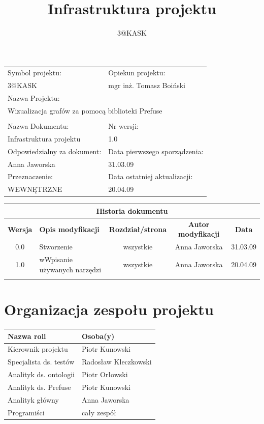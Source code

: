 \documentclass[a4paper,10pt,twoside]{article}
\title{Infrastruktura projektu}
\author{3@KASK}
\begin{document}



\maketitle


\begin{center}
\begin{tabular}{|p{7cm}|p{7cm}|}
\hline
Symbol projektu: & Opiekun projektu:   \tabularnewline 
3@KASK & mgr inż. Tomasz Boiński    \tabularnewline \hline
\multicolumn{2}{|l|}{Nazwa Projektu: } \tabularnewline
\multicolumn{2}{|l|}{Wizualizacja grafów za pomocą biblioteki Prefuse } \tabularnewline 
\hline
\multicolumn{2}{l}{ } \tabularnewline %
\hline 
Nazwa Dokumentu: & Nr wersji:   \tabularnewline 
Infrastruktura projektu & 1.0 \tabularnewline \hline
Odpowiedzialny za dokument: & Data pierwszego sporządzenia:   \tabularnewline 
Anna Jaworska  & 31.03.09 \tabularnewline \hline
Przeznaczenie: & Data ostatniej aktualizacji:   \tabularnewline 
WEWNĘTRZNE & 20.04.09 \tabularnewline \hline
\end{tabular}
\end{center}

\begin{center}
\begin{tabular}{|c|p{4cm}|c|c|c|}
\multicolumn{5}{c}{\textbf{Historia dokumentu}} \tabularnewline \hline
\textbf{Wersja} & \textbf{Opis modyfikacji} & \textbf{Rozdział/strona} & \textbf{Autor modyfikacji} & \textbf{Data} \tabularnewline \hline 
0.0 & Stworzenie & wszystkie & Anna Jaworska & 31.03.09 \tabularnewline \hline
1.0 & wWpisanie używanych narzędzi & wszystkie & Anna Jaworska & 20.04.09 \tabularnewline \hline
& & & &\tabularnewline \hline
\end{tabular}
 

\end{center}


\newpage
\tableofcontents


\section{Organizacja zespołu projektu}
\begin{center}
\begin{tabular}{|l|l|} \hline
	Nazwa roli & Osoba(y) \tabularnewline \hline
	Kierownik projektu & Piotr Kunowski \tabularnewline \hline
	Specjalista ds. testów & Radosław Kleczkowski \tabularnewline \hline
	Analityk ds. ontologii & Piotr Orłowski \tabularnewline \hline
	Analityk ds. Prefuse & Piotr Kunowski \tabularnewline \hline
	Analityk główny & Anna Jaworska \tabularnewline \hline
	Programiści & cały zespół \tabularnewline \hline
\end{tabular}
\end{center}
\end{document}
